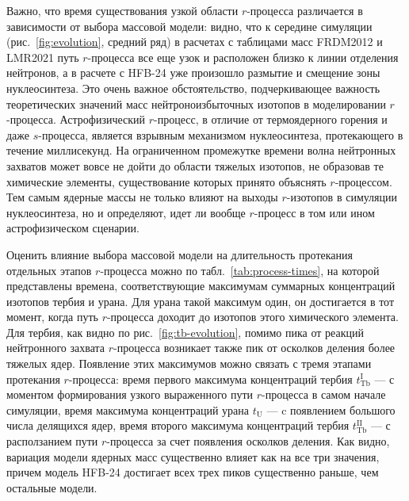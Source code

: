 Важно, что время существования узкой области $r$-процесса различается в зависимости от выбора массовой модели: видно, что к середине симуляции (рис.~\ref{fig:evolution}, средний ряд) в расчетах с таблицами масс FRDM2012 и LMR2021 путь $r$-процесса все еще узок и расположен близко к линии отделения нейтронов, а в расчете с HFB-24 уже произошло размытие и смещение зоны нуклеосинтеза. Это очень важное обстоятельство, подчеркивающее важность теоретических значений масс нейтроноизбыточных изотопов в моделировании $r$-процесса. Астрофизический $r$-процесс, в отличие от термоядерного горения и даже $s$-процесса, является взрывным механизмом нуклеосинтеза, протекающего в течение миллисекунд. На ограниченном промежутке времени волна нейтронных захватов может вовсе не дойти до области тяжелых изотопов, не образовав те химические элементы, существование которых принято объяснять $r$-процессом. Тем самым ядерные массы не только влияют на выходы $r$-изотопов в симуляции нуклеосинтеза, но и определяют, идет ли вообще $r$-процесс в том или ином астрофизическом сценарии.

Оценить влияние выбора массовой модели на длительность протекания отдельных этапов $r$-процесса можно по табл.~\ref{tab:process-times}, на которой представлены времена, соответствующие максимумам суммарных концентраций изотопов тербия и урана. Для урана такой максимум один, он достигается в тот момент, когда путь $r$-процесса доходит до изотопов этого химического элемента. Для тербия, как видно по рис.~\ref{fig:tb-evolution}, помимо пика от реакций нейтронного захвата $r$-процесса возникает также пик от осколков деления более тяжелых ядер. Появление этих максимумов можно связать с тремя этапами протекания $r$-процесса: время первого максимума концентраций тербия $t^\text{I}_\text{Tb}$ --- с моментом формирования узкого выраженного пути $r$-процесса в самом начале симуляции, время максимума концентраций урана $t_\text{U}$ --- c появлением большого числа делящихся ядер, время второго максимума концентраций тербия $t^\text{II}_\text{Tb}$ --- с расползанием пути $r$-процесса за счет появления осколков деления. Как видно, вариация модели ядерных масс существенно влияет как на все три значения, причем модель HFB-24 достигает всех трех пиков существенно раньше, чем остальные модели.

